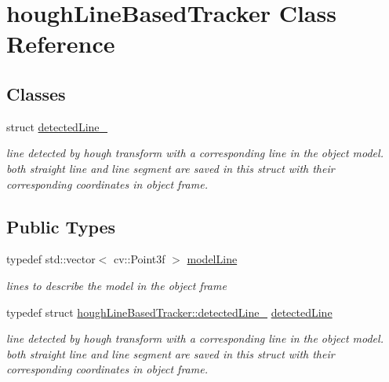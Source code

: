 \hypertarget{classhoughLineBasedTracker}{\section{hough\-Line\-Based\-Tracker \-Class \-Reference}
\label{classhoughLineBasedTracker}
}
\subsection*{\-Classes}
\begin{DoxyCompactItemize}
\item 
struct \hyperlink{structhoughLineBasedTracker_1_1detectedLine__}{detected\-Line\-\_\-}
\begin{DoxyCompactList}\small\item\em line detected by hough transform with a corresponding line in the object model. both straight line and line segment are saved in this struct with their corresponding coordinates in object frame. \end{DoxyCompactList}\end{DoxyCompactItemize}
\subsection*{\-Public \-Types}
\begin{DoxyCompactItemize}
\item 
\hypertarget{classhoughLineBasedTracker_ac5e746870094fed71d26ed75d4a099e5}{typedef std\-::vector$<$ cv\-::\-Point3f $>$ \hyperlink{classhoughLineBasedTracker_ac5e746870094fed71d26ed75d4a099e5}{model\-Line}}\label{classhoughLineBasedTracker_ac5e746870094fed71d26ed75d4a099e5}

\begin{DoxyCompactList}\small\item\em lines to describe the model in the object frame \end{DoxyCompactList}\item 
\hypertarget{classhoughLineBasedTracker_a5f50eb8aa0cd3b60d159ef42227f9b48}{typedef struct \*
\hyperlink{structhoughLineBasedTracker_1_1detectedLine__}{hough\-Line\-Based\-Tracker\-::detected\-Line\-\_\-} \hyperlink{classhoughLineBasedTracker_a5f50eb8aa0cd3b60d159ef42227f9b48}{detected\-Line}}\label{classhoughLineBasedTracker_a5f50eb8aa0cd3b60d159ef42227f9b48}

\begin{DoxyCompactList}\small\item\em line detected by hough transform with a corresponding line in the object model. both straight line and line segment are saved in this struct with their corresponding coordinates in object frame. \end{DoxyCompactList}\end{DoxyCompactItemize}

